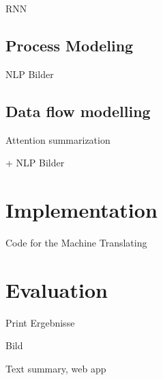 RNN

\subsection{Process Modeling}

NLP Bilder

\subsection{Data flow modelling}

Attention summarization 

+ NLP Bilder

\section{Implementation}

Code for the Machine Translating

\section{Evaluation}

Print Ergebnisse

Bild

Text summary, web app


